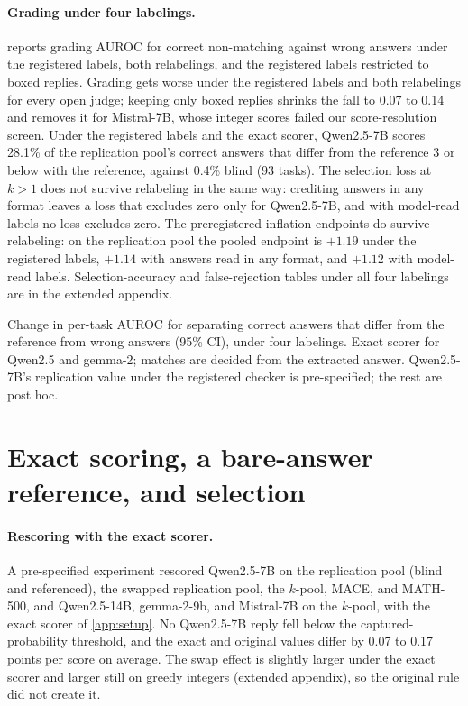 \paragraph{Grading under four labelings.}
 reports grading AUROC for correct non-matching against wrong answers under the registered labels, both relabelings, and the registered labels restricted to boxed replies. Grading gets worse under the registered labels and both relabelings for every open judge; keeping only boxed replies shrinks the fall to 0.07 to 0.14 and removes it for Mistral-7B, whose integer scores failed our score-resolution screen. Under the registered labels and the exact scorer, Qwen2.5-7B scores 28.1\% of the replication pool's correct answers that differ from the reference 3 or below with the reference, against 0.4\% blind (93 tasks).\pre{} The selection loss at $k{>}1$ does not survive relabeling in the same way: crediting answers in any format leaves a loss that excludes zero only for Qwen2.5-7B, and with model-read labels no loss excludes zero. The preregistered inflation endpoints do survive relabeling: on the replication pool the pooled endpoint is $+1.19$ under the registered labels, $+1.14$ with answers read in any format, and $+1.12$ with model-read labels.\ph{} Selection-accuracy and false-rejection tables under all four labelings are in the extended appendix.

\begin{table}[htbp]
\centering
\caption{Change in per-task AUROC for separating correct answers that differ from the reference from wrong answers (95\% CI), under four labelings. Exact scorer for Qwen2.5 and gemma-2; matches are decided from the extracted answer. Qwen2.5-7B's replication value under the registered checker is pre-specified; the rest are post hoc.}
\label{tab:labelings-gnm}
\footnotesize
\setlength{\tabcolsep}{3pt}
\begin{adjustbox}{max width=\linewidth}\end{adjustbox}
\end{table}

\FloatBarrier
\section{Exact scoring, a bare-answer reference, and selection}
\label{app:estimator}

\paragraph{Rescoring with the exact scorer.}
A pre-specified experiment rescored Qwen2.5-7B on the replication pool (blind and referenced), the swapped replication pool, the $k$-pool, \textsc{MACE}, and MATH-500, and Qwen2.5-14B, gemma-2-9b, and Mistral-7B on the $k$-pool, with the exact scorer of \cref{app:setup}. No Qwen2.5-7B reply fell below the captured-probability threshold, and the exact and original values differ by 0.07 to 0.17 points per score on average. The swap effect is slightly larger under the exact scorer and larger still on greedy integers (extended appendix), so the original rule did not create it.\pre
